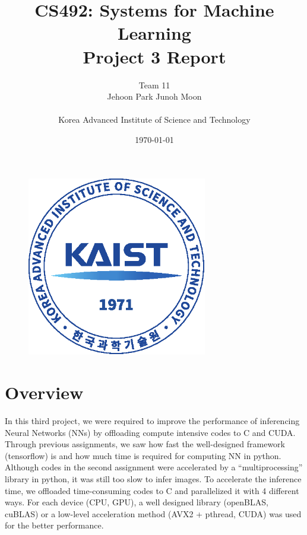 \documentclass[a4paper,12pt]{article}
\begin{document}
\title{CS492: Systems for Machine Learning\\\large Project 3 Report}
\author{Team 11\\Jehoon Park \qquad Junoh Moon\\\\Korea Advanced Institute of Science and Technology}
\date{\today}

\begin{figure}[!b]
	\centering
	\includegraphics[width=0.7\textwidth]{./kaist_emblem2.eps}
\end{figure}

\maketitle
\thispagestyle{empty} %
\newpage

\section{Overview}

In this third project, we were required to improve the performance of inferencing Neural Networks (NNs) by offloading compute intensive codes to C and CUDA\@. Through previous assignments, we saw how fast the well-designed framework (tensorflow) is and how much time is required for computing NN in python. Although codes in the second assignment were accelerated by a  “multiprocessing” library in python, it was still too slow to infer images. To accelerate the inference time, we offloaded time-consuming codes to C and parallelized it with 4 different ways. For each device (CPU, GPU), a well designed library (openBLAS, cuBLAS) or a low-level acceleration method (AVX2 + pthread, CUDA) was used for the better performance.
\end{document}
